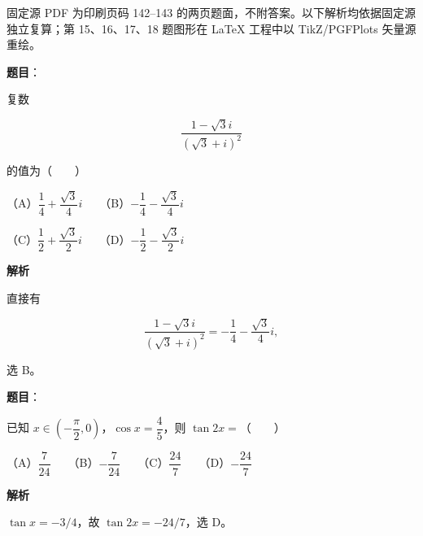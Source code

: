 

\begin{gktip}
固定源 PDF 为印刷页码 142–143 的两页题面，不附答案。以下解析均依据固定源独立复算；第 15、16、17、18 题图形在 LaTeX 工程中以 TikZ/PGFPlots 矢量源重绘。
\end{gktip}


\begin{answer}

\textbf{题目}：

复数

\nopagebreak[4]
\[
\frac{1-\sqrt3 i}{(\sqrt3+i)^2}
\]

的值为\mbox{（　　）}

（A）$\dfrac14+\dfrac{\sqrt3}{4}i$　　（B）$-\dfrac14-\dfrac{\sqrt3}{4}i$

（C）$\dfrac12+\dfrac{\sqrt3}{2}i$　　（D）$-\dfrac12-\dfrac{\sqrt3}{2}i$

\textbf{解析}

直接有

\nopagebreak[4]
\[
\frac{1-\sqrt3i}{(\sqrt3+i)^2}
=-\frac14-\frac{\sqrt3}{4}i,
\]

选 B。


\end{answer}
\begin{answer}

\textbf{题目}：

已知 $x\in\left(-\dfrac\pi2,0\right)$，$\cos x=\dfrac45$，则 $\tan2x=$\mbox{（　　）}

（A）$\dfrac7{24}$　　（B）$-\dfrac7{24}$　　（C）$\dfrac{24}{7}$　　（D）$-\dfrac{24}{7}$

\textbf{解析}

$\tan x=-3/4$，故 $\tan2x=-24/7$，选 D。


\end{answer}
